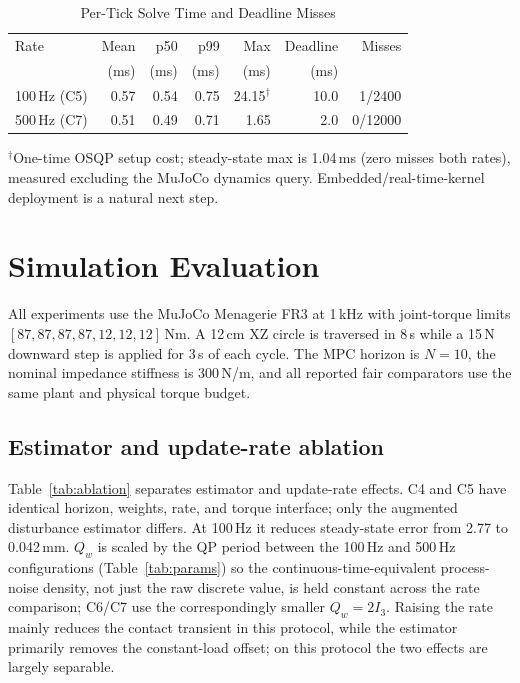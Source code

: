 \documentclass[conference]{IEEEtran}
\begin{document}
\begin{table}[t]
\caption{Per-Tick Solve Time and Deadline Misses}
\label{tab:timing}
\centering
\footnotesize
\setlength{\tabcolsep}{3.5pt}
\begin{tabular}{@{}lrrrrrr@{}}
\toprule
Rate & Mean & p50 & p99 & Max & Deadline & Misses\\
 & (ms) & (ms) & (ms) & (ms) & (ms) &\\
\midrule
100\,Hz (C5) & 0.57 & 0.54 & 0.75 & 24.15$^\dagger$ & 10.0 & 1/2400\\
500\,Hz (C7) & 0.51 & 0.49 & 0.71 & 1.65 & 2.0 & 0/12000\\
\bottomrule
\end{tabular}
\end{table}
\noindent $^\dagger$One-time OSQP setup cost; steady-state max is 1.04\,ms
(zero misses both rates), measured excluding the MuJoCo dynamics query.
Embedded/real-time-kernel deployment is a natural next step.

\section{Simulation Evaluation}

All experiments use the MuJoCo Menagerie FR3
\cite{mujoco_menagerie,todorov2012mujoco} at 1\,kHz with joint-torque limits
$[87,87,87,87,12,12,12]$\,Nm. A 12\,cm XZ circle is traversed in 8\,s while a
15\,N downward step is applied for 3\,s of each cycle. The MPC horizon is
$N=10$, the nominal impedance stiffness is 300\,N/m, and all reported fair
comparators use the same plant and physical torque budget.

\subsection{Estimator and update-rate ablation}

Table~\ref{tab:ablation} separates estimator and update-rate effects. C4 and
C5 have identical horizon, weights, rate, and torque interface; only the
augmented disturbance estimator differs. At 100\,Hz it reduces steady-state
error from 2.77 to 0.042\,mm. $Q_w$ is scaled by the QP period between the
100\,Hz and 500\,Hz configurations (Table~\ref{tab:params}) so the
continuous-time-equivalent process-noise density, not just the raw discrete
value, is held constant across the rate comparison; C6/C7 use the
correspondingly smaller $Q_w=2I_3$. Raising the rate mainly reduces the
contact transient in this protocol, while the estimator primarily removes
the constant-load offset; on this protocol the two effects are largely
separable.
\end{document}
